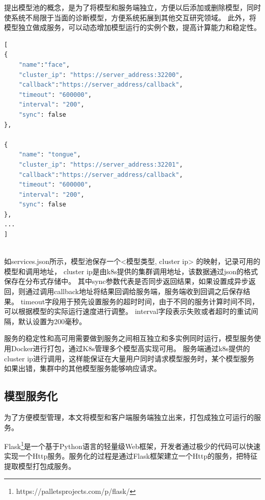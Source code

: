 提出模型池的概念，是为了将模型和服务端独立，方便以后添加或删除模型，同时使系统不局限于当面的诊断模型，方便系统拓展到其他交互研究领域。
此外，将模型独立做成服务，可以动态增加模型运行的实例个数，提高计算能力和稳定性。



\begin{lstlisting}[language={Python}, title=services.json]
[
{
    "name":"face",
    "cluster_ip": "https://server_address:32200",
    "callback":"https://server_address/callback",
    "timeout": "600000",
    "interval": "200",
    "sync": false
}, 

{
    "name": "tongue",
    "cluster_ip": "https://server_address:32201",
    "callback":"https://server_address/callback",
    "timeout": "600000",
    "interval": "200",
    "sync": false
},
...
]
    
\end{lstlisting}

如services.json所示，模型池保存一个<模型类型, cluster ip> 的映射，记录可用的模型和调用地址， cluster ip是由k8s提供的集群调用地址，该数据通过json的格式保存在分布式存储中。
其中sync参数代表是否同步返回结果，如果设置成异步返回，则通过调用callback地址将结果回调给服务端，服务端收到回调之后保存结果。
timeout字段用于预先设置服务的超时时间，由于不同的服务计算时间不同，可以根据模型的实际运行速度进行调整。
interval字段表示失败或者超时的重试间隔，默认设置为200毫秒。

服务的稳定性和高可用需要做到服务之间相互独立和多实例同时运行，模型服务使用Docker进行打包，通过K8s管理多个模型高实现可用。
服务端通过k8s提供的cluster ip进行调用，这样能保证在大量用户同时请求模型服务时，某个模型服务如果出错，集群中的其他模型服务能够响应请求。


\subsection{模型服务化}
为了方便模型管理，本文将模型和客户端服务端独立出来，打包成独立可运行的服务。

Flask\footnote{https://palletsprojects.com/p/flask/}是一个基于Python语言的轻量级Web框架，开发者通过极少的代码可以快速实现一个Http服务。服务化的过程是通过Flask框架建立一个Http的服务，把特征提取模型打包成服务。

